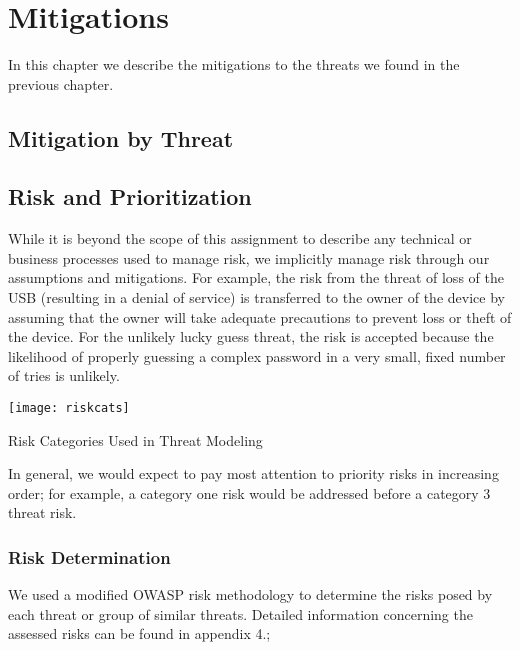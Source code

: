 \chapter{Mitigations}
\label{ch:mitigations}
In this chapter we describe the mitigations to the threats we found in
the previous chapter.

\section{Mitigation by Threat}

\section{Risk and Prioritization}
\label{sec:risk}
While it is beyond the scope of this assignment to describe any technical or
business processes used to manage risk, we implicitly manage risk through our
assumptions and mitigations.  For example, the risk from the threat of loss of
the USB (resulting in a denial of service) is transferred to the owner of the
device by assuming that the owner will take adequate precautions to prevent loss
or theft of the device.  For the unlikely lucky guess threat, the risk is
accepted because the likelihood of properly guessing a complex password in a
very small, fixed number of tries is unlikely.

\begin{marginfigure}
    \centering
    \texttt{[image: riskcats]}
    \caption{Risk Categories Used in Threat Modeling}
    \label{fig:riskcats}
\end{marginfigure}

In general, we would expect to pay most attention to priority risks in
increasing order; for example, a category one risk would be addressed before a
category 3 threat risk.

\subsection{Risk Determination}
We used a modified OWASP risk methodology to determine the risks posed by each
threat or group of similar threats. Detailed information concerning the assessed
risks can be found in appendix 4.;
